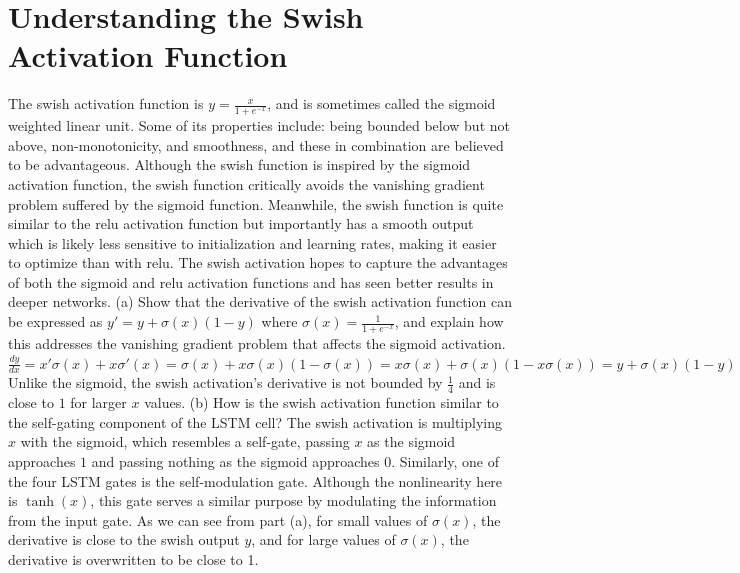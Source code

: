 \documentclass{article}
\begin{document}
\section{Understanding the Swish Activation Function}
The swish activation function is $y=\frac{x}{1+e^{-x}}$, and is sometimes called the sigmoid weighted linear unit. Some of its properties include: being bounded below but not above, non-monotonicity, and smoothness, and these in combination are believed to be advantageous. Although the swish function is inspired by the sigmoid activation function, the swish function critically avoids the vanishing gradient problem suffered by the sigmoid function. Meanwhile, the swish function is quite similar to the relu activation function but importantly has a smooth output which is likely less sensitive to initialization and learning rates, making it easier to optimize than with relu. The swish activation hopes to capture the advantages of both the sigmoid and relu activation functions and has seen better results in deeper networks.\newline\newline
\color{black}(a) Show that the derivative of the swish activation function can be expressed as $y'=y+\sigma (x)(1-y)$ where $\sigma (x)=\frac{1}{1+e^{-x}}$, and explain how this addresses the vanishing gradient problem that affects the sigmoid activation.\newline\newline
\color{blue} $\frac{dy}{dx}=x'\sigma(x)+x\sigma'(x)=\sigma(x)+x\sigma(x)(1-\sigma(x))=x\sigma(x)+\sigma(x)(1-x\sigma(x))=y+\sigma(x)(1-y)$ \newline Unlike the sigmoid, the swish activation's derivative is not bounded by $\frac{1}{4}$ and is close to $1$ for larger $x$ values.\newline\newline
\color{black}(b) How is the swish activation function similar to the self-gating component of the LSTM cell?\newline\newline
\color{blue}The swish activation is multiplying $x$ with the sigmoid, which resembles a self-gate, passing $x$ as the sigmoid approaches $1$ and passing nothing as the sigmoid approaches $0$. Similarly, one of the four LSTM gates is the self-modulation gate. Although the nonlinearity here is $\tanh(x)$, this gate serves a similar purpose by modulating the information from the input gate. As we can see from part (a), for small values of $\sigma(x)$, the derivative is close to the swish output $y$, and for large values of $\sigma(x)$, the derivative is overwritten to be close to 1. \newline\newline
\end{document}
